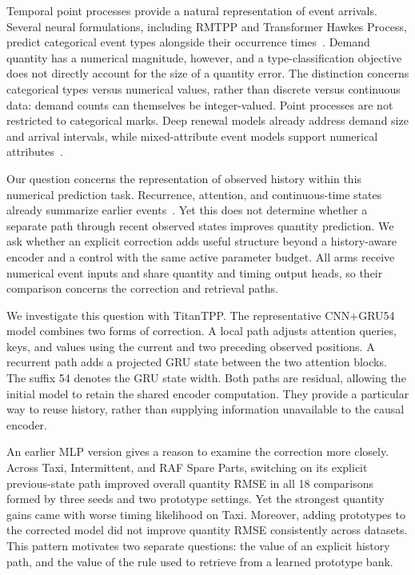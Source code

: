 \documentclass[runningheads]{llncs}
\newcommand{\method}{TitanTPP}
\begin{document}
Temporal point processes provide a natural representation of event arrivals. Several neural formulations, including RMTPP and Transformer Hawkes Process, predict categorical event types alongside their occurrence times~\cite{du2016rmtpp,zuo2020thp}. Demand quantity has a numerical magnitude, however, and a type-classification objective does not directly account for the size of a quantity error. The distinction concerns categorical types versus numerical values, rather than discrete versus continuous data: demand counts can themselves be integer-valued. Point processes are not restricted to categorical marks. Deep renewal models already address demand size and arrival intervals, while mixed-attribute event models support numerical attributes~\cite{turkmen2021renewal,draxler2025flextpp}.

Our question concerns the representation of observed history within this numerical prediction task. Recurrence, attention, and continuous-time states already summarize earlier events~\cite{mei2017nhp,yang2022anhp,chang2025s2p2}. Yet this does not determine whether a separate path through recent observed states improves quantity prediction. We ask whether an explicit correction adds useful structure beyond a history-aware encoder and a control with the same active parameter budget. All arms receive numerical event inputs and share quantity and timing output heads, so their comparison concerns the correction and retrieval paths.

We investigate this question with \method. The representative CNN+GRU54 model combines two forms of correction. A local path adjusts attention queries, keys, and values using the current and two preceding observed positions. A recurrent path adds a projected GRU state between the two attention blocks. The suffix 54 denotes the GRU state width. Both paths are residual, allowing the initial model to retain the shared encoder computation. They provide a particular way to reuse history, rather than supplying information unavailable to the causal encoder.

An earlier MLP version gives a reason to examine the correction more closely. Across Taxi, Intermittent, and RAF Spare Parts, switching on its explicit previous-state path improved overall quantity RMSE in all 18 comparisons formed by three seeds and two prototype settings. Yet the strongest quantity gains came with worse timing likelihood on Taxi. Moreover, adding prototypes to the corrected model did not improve quantity RMSE consistently across datasets. This pattern motivates two separate questions: the value of an explicit history path, and the value of the rule used to retrieve from a learned prototype bank.
\end{document}
